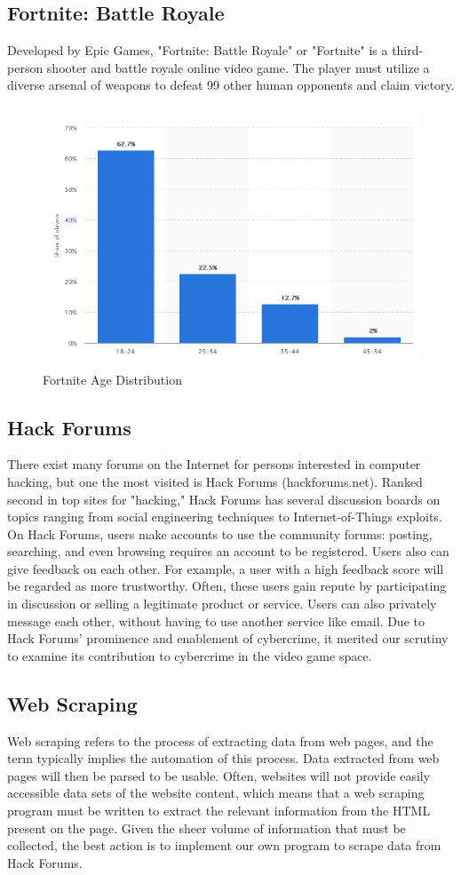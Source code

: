 \documentclass[sigconf]{acmart}
\begin{document}
\subsection{Fortnite: Battle Royale}
Developed by Epic Games, "Fortnite: Battle Royale" or "Fortnite" is a 
third-person shooter and battle royale online video game. The player must
utilize a diverse arsenal of weapons to defeat 99 other human opponents and 
claim victory. 

\begin{figure}[h]
	\centering
	\includegraphics[width=.5\textwidth]{DistributionFortniteAge.png}
	\caption{Fortnite Age Distribution}
\end{figure}

\subsection{Hack Forums}
There exist many forums on the Internet for persons interested in computer
hacking, but one the most visited is Hack Forums (hackforums.net). Ranked
second in top sites for "hacking," \cite{alexa} Hack Forums has several discussion boards
on topics ranging from social engineering techniques to Internet-of-Things 
exploits. On Hack Forums, users make accounts to use the community forums:
posting, searching, and even browsing requires an account to be registered.
Users also can give feedback on each other. For example, a user with
a high feedback score will be regarded as more trustworthy. Often, these users
gain repute by participating in discussion or selling a legitimate product or 
service. Users can also privately message each other, without having to use
another service like email. Due to Hack Forums' prominence and enablement of 
cybercrime, it merited our scrutiny to examine its contribution to cybercrime
in the video game space. 

\subsection{Web Scraping}
Web scraping refers to the process of extracting data from web pages, and the 
term typically implies the automation of this process. Data extracted from web
pages will then be parsed to be usable. Often, websites will not provide 
easily accessible data sets of the website content, which means that a 
web scraping program must be written to extract the relevant information from
the HTML present on the page. Given the sheer volume of information that must
be collected, the best action is to implement our own program to scrape data 
from Hack Forums.
\end{document}
